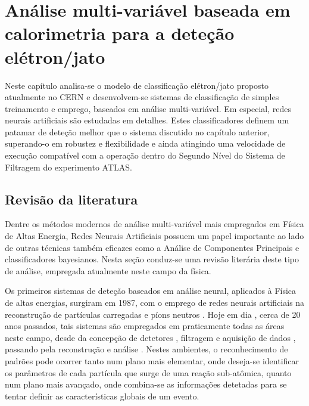 \typeout{ ====================================================================}
\typeout{ ====================================================================}

\chapter{Análise multi-variável baseada em calorimetria para a deteção
elétron/jato} 
\label{chap:neural}

Neste capítulo analisa-se o modelo de classificação elétron/jato proposto
atualmente no CERN e desenvolvem-se sistemas de classificação de simples
treinamento e emprego, baseados em análise multi-variável. Em especial, redes
neurais artificiais são estudadas em detalhes. Estes classificadores definem
um patamar de deteção melhor que o sistema discutido no capítulo anterior,
superando-o em robustez e flexibilidade e ainda atingindo uma velocidade de
execução compatível com a operação dentro do Segundo Nível do Sistema de
Filtragem do experimento ATLAS.

\section{Revisão da literatura}
\label{sec:review}

Dentre os métodos modernos de análise multi-variável mais empregados em Física
de Altas Energia, Redes Neurais Artificiais possuem um papel importante ao
lado de outras técnicas também eficazes como a Análise de Componentes
Principais e classificadores bayesianos. Nesta seção conduz-se uma revisão
literária deste tipo de análise, empregada atualmente neste campo da física.

Os primeiros sistemas de deteção baseados em análise neural, aplicados à
Física de altas energias, surgiram em 1987, com o emprego de redes neurais
artificiais na reconstrução de partículas carregadas e píons neutros
\cite{denby-nim-1997}. Hoje em dia \cite{denby-nim-2004}, cerca de 20 anos
passados, tais sistemas são empregados em praticamente todas as áreas neste
campo, desde da concepção de detetores \cite{wilk-nim-2006}, filtragem e
aquisição de dados \cite{denby-nim-2003, kohne-nim-1997, varela-cms-1998},
passando pela reconstrução  \cite{peterson-nim-1988} e análise
\cite{kiesling-nim-2004, bhat-aip-1995}. Nestes ambientes, o reconhecimento de
padrões pode ocorrer tanto num plano mais elementar, onde deseja-se
identificar os parâmetros de cada partícula que surge de uma reação
sub-atômica, quanto num plano mais avançado, onde combina-se as informações
detetadas para se tentar definir as características globais de um evento.

